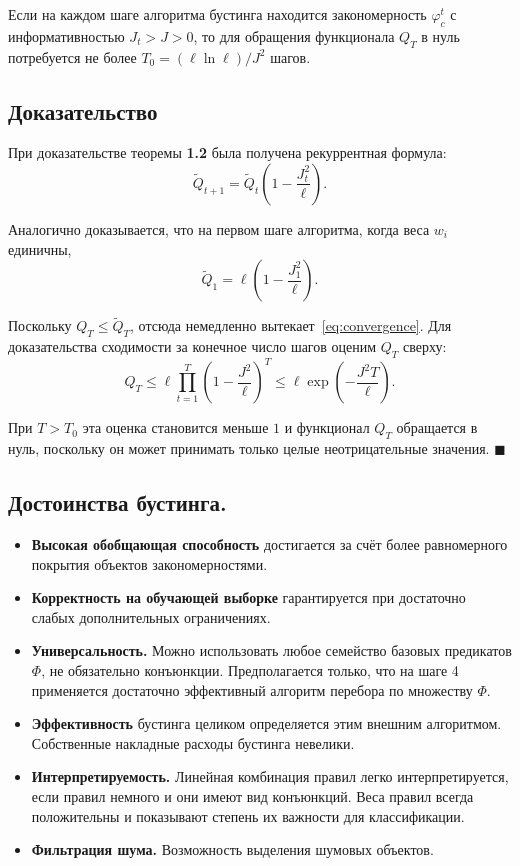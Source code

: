 Если на каждом шаге алгоритма бустинга находится закономерность $\varphi_c^t$ с информативностью $J_t > J > 0$, то для обращения функционала $Q_T$ в нуль потребуется не более $T_0 = (\ell \ln \ell) / J^2$ шагов.

\subsection*{Доказательство}
При доказательстве теоремы \textbf{1.2} была получена рекуррентная формула:
\begin{equation}
    \tilde{Q}_{t+1} = \tilde{Q}_t \left( 1 - \frac{J_t^2}{\ell} \right).
\end{equation}

Аналогично доказывается, что на первом шаге алгоритма, когда веса $w_i$ единичны,
\[
    \tilde{Q}_1 = \ell \left( 1 - \frac{J_1^2}{\ell} \right).
\]

Поскольку $Q_T \leq \tilde{Q}_T$, отсюда немедленно вытекает~\eqref{eq:convergence}. Для доказательства сходимости за конечное число шагов оценим $Q_T$ сверху:
\[
    Q_T \leq \ell \prod_{t=1}^T \left( 1 - \frac{J^2}{\ell} \right)^T \leq \ell \exp\left( -\frac{J^2 T}{\ell} \right).
\]

При $T > T_0$ эта оценка становится меньше $1$ и функционал $Q_T$ обращается в нуль, поскольку он может принимать только целые неотрицательные значения. \hfill $\blacksquare$

\subsection*{Достоинства бустинга.}

\begin{itemize}
    \item \textbf{Высокая обобщающая способность} достигается за счёт более равномерного покрытия объектов закономерностями.
          
    \item \textbf{Корректность на обучающей выборке} гарантируется при достаточно слабых дополнительных ограничениях.
          
    \item \textbf{Универсальность.} Можно использовать любое семейство базовых предикатов $\Phi$, не обязательно конъюнкции. Предполагается только, что на шаге 4 применяется достаточно эффективный алгоритм перебора по множеству $\Phi$.
          
    \item \textbf{Эффективность} бустинга целиком определяется этим внешним алгоритмом. Собственные накладные расходы бустинга невелики.
          
    \item \textbf{Интерпретируемость.} Линейная комбинация правил легко интерпретируется, если правил немного и они имеют вид конъюнкций. Веса правил всегда положительны и показывают степень их важности для классификации.
          
    \item \textbf{Фильтрация шума.} Возможность выделения шумовых объектов.
\end{itemize}

